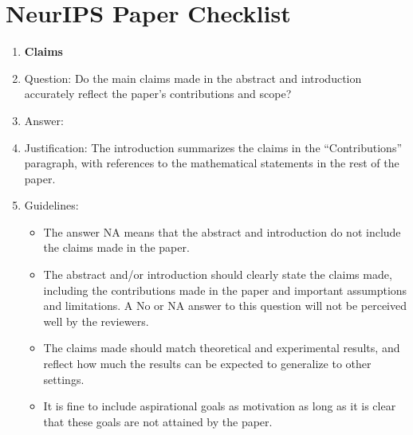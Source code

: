 \documentclass{article}
\begin{document}
\newpage
\section*{NeurIPS Paper Checklist}









\begin{enumerate}

\item {\bf Claims}
    \item[] Question: Do the main claims made in the abstract and introduction accurately reflect the paper's contributions and scope?
    \item[] Answer: \answerYes{} %
    \item[] Justification: The introduction summarizes the claims in the ``Contributions'' paragraph, with references to the mathematical statements in the rest of the paper.
    \item[] Guidelines:
    \begin{itemize}
        \item The answer NA means that the abstract and introduction do not include the claims made in the paper.
        \item The abstract and/or introduction should clearly state the claims made, including the contributions made in the paper and important assumptions and limitations. A No or NA answer to this question will not be perceived well by the reviewers.
        \item The claims made should match theoretical and experimental results, and reflect how much the results can be expected to generalize to other settings.
        \item It is fine to include aspirational goals as motivation as long as it is clear that these goals are not attained by the paper.
    \end{itemize}


\end{enumerate}
\end{document}
